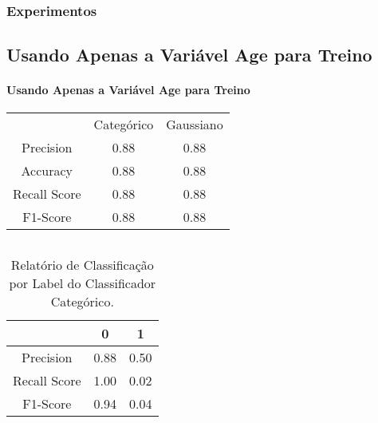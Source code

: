 \documentclass{beamer}
\begin{document}
\begin{frame}
    \frametitle{Experimentos}
    \subsection{Usando Apenas a Variável Age para Treino}
    \framesubtitle{Usando Apenas a Variável Age para Treino}
    \begin{table}[H]
        \centering
        \begin{small}
            \begin{tabular}{ccc}
                \\
                \\
                \hline
                                        & Categórico       & Gaussiano\\
                \hline
                Precision               & 0.88             & 0.88\\
                Accuracy                & 0.88             & 0.88\\
                Recall Score            & 0.88             & 0.88\\
                F1-Score                & 0.88             & 0.88\\
                
                \hline
            \end{tabular}
        \end{small}
    \end{table}
        \begin{columns}
            \begin{column}{0.5\textwidth}
                \begin{table}[H]

                    \centering
                    \caption{\label{tab:cr2-cnb} Relatório de Classificação por Label do Classificador Categórico.}
                    \begin{small}
                        \begin{tabular}{ccc}
                        
                            \hline
                                                    & 0                & 1\\
                            \hline
                            Precision               & 0.88             & 0.50\\
                            Recall Score            & 1.00             & 0.02\\
                            F1-Score                & 0.94             & 0.04\\
                            

\end{tabular}
\end{small}
\end{table}
\end{column}
\end{columns}
\end{frame}
\end{document}
